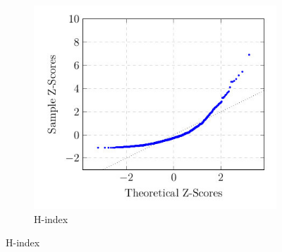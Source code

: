 \documentclass[man]{apa6}
\begin{document}
\begin{figure}[h]
\centering
\begin{subfigure}[b]{0.4\textwidth}
    \centerline{\includegraphics[scale=0.45]{normal_plot_hindex}}

    \caption{H-index}
    \label{fig:hindex_normality}
  

\end{subfigure}
\end{figure}
\end{document}
